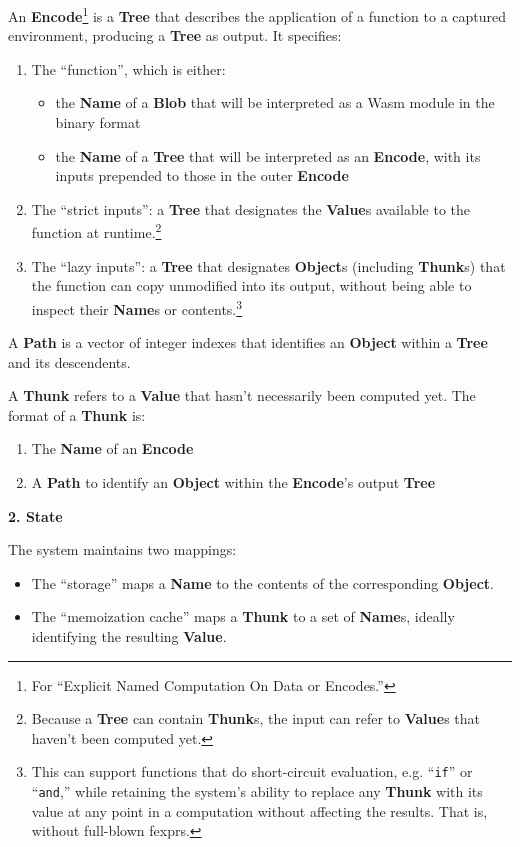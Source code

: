 \documentclass{article}
\newcommand{\blob}{\textbf{Blob}\xspace}
\newcommand{\valuex}{\textbf{Value}\xspace}
\newcommand{\valuexs}{\textbf{Value}s\xspace}
\newcommand{\object}{\textbf{Object}\xspace}
\newcommand{\objects}{\textbf{Object}s\xspace}
\newcommand{\encode}{\textbf{Encode}\xspace}
\newcommand{\thunk}{\textbf{Thunk}\xspace}
\newcommand{\thunks}{\textbf{Thunk}s\xspace}
\newcommand{\name}{\textbf{Name}\xspace}
\newcommand{\names}{\textbf{Name}s\xspace}
\newcommand{\tree}{\textbf{Tree}\xspace}
\newcommand{\pathx}{\textbf{Path}\xspace}
\begin{document}
An \encode\footnote{For ``Explicit Named Computation On Data or
  Encodes.''} is a \tree that describes the application of a function
to a captured environment, producing a \tree as output. It specifies:
\begin{enumerate}[topsep=0pt]

\item The ``function'', which is either:
\begin{itemize}[topsep=0pt]
\item the \name of a \blob that will be interpreted as a Wasm module in the binary format
\item the \name of a \tree that will be interpreted as an \encode, with its inputs prepended to those in the outer \encode
\end{itemize}

\item The ``strict inputs'': a \tree that designates the
  \valuexs available to the function at runtime.\footnote{Because a
    \tree can contain \thunks, the input can refer to \valuexs that haven't been computed yet.}
  
\item The ``lazy inputs'': a \tree that designates \objects
  (including \thunks) that the function can copy unmodified into its
  output, without being able to inspect their \names or contents.\footnote{This can support
    functions that do short-circuit evaluation, e.g. ``\texttt{if}''
    or ``\texttt{and},'' while retaining the system's ability to
    replace any \thunk with its value at any point in a
    computation without affecting the results. That is, without
    full-blown fexprs.}
\end{enumerate}

A \pathx is a vector of integer indexes that identifies an \object
within a \tree and its descendents.

\enlargethispage{\baselineskip}

A \thunk refers to a \valuex that hasn't necessarily been computed yet. The format of a \thunk is:
\begin{enumerate}[topsep=0pt]
\item The \name of an \encode
\item A \pathx to identify an \object within the \encode's output \tree
  \end{enumerate}

{\Large \textbf{2. State}}

The system maintains two mappings:
\begin{itemize}[topsep=0pt]
\item The ``storage'' maps a \name to the contents of the corresponding \object.

\item The ``memoization cache'' maps a \thunk to a set of \names, ideally identifying the resulting \valuex.
\end{itemize}
  
\end{document}
